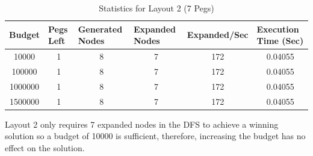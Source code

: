 \documentclass[12pt,a4paper]{article}
\begin{document}
\begin{table}[H]
\caption{Statistics for Layout 2 (7 Pegs)}
\label{tab:my-table}

\begin{tabular}{|c|c|c|c|c|c|}
\hline
Budget  & \multicolumn{1}{l|}{Pegs Left} & \multicolumn{1}{l|}{Generated Nodes} & \multicolumn{1}{l|}{Expanded Nodes} & \multicolumn{1}{l|}{Expanded/Sec} & \multicolumn{1}{l|}{Execution Time (Sec)} \\ \hline
10000   & 1                              & 8                                    & 7                                   & 172                                  & 0.04055                                               \\ \hline
100000  & 1                              & 8                                    & 7                                   & 172                                  & 0.04055                                               \\ \hline
1000000 & 1                              & 8                                    & 7                                   & 172                                  & 0.04055                                               \\ \hline
1500000 & 1                              & 8                                    & 7                                   & 172                                  & 0.04055                                               \\ \hline
\end{tabular}
\end{table}
Layout 2 only requires 7 expanded nodes in the DFS to achieve a winning solution so a budget of 10000 is sufficient, therefore, increasing the budget has no effect on the solution.\\
\end{document}
